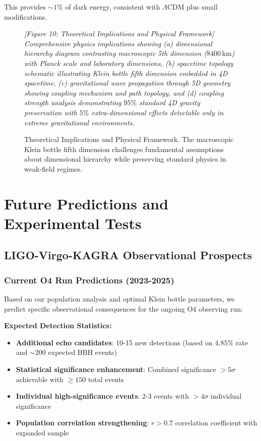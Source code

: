 \documentclass[reprint,amsmath,amssymb,aps,prd]{revtex4-2}
\newcommand{\km}{\,\text{km}}
\begin{document}
This provides $\sim 1\%$ of dark energy, consistent with $\Lambda$CDM plus small modifications.

\begin{figure}[htbp]
\centering
\textit{[Figure 10: Theoretical Implications and Physical Framework]}
\textit{Comprehensive physics implications showing (a) dimensional hierarchy diagram contrasting macroscopic 5th dimension ($8400\km$) with Planck scale and laboratory dimensions, (b) spacetime topology schematic illustrating Klein bottle fifth dimension embedded in 4D spacetime, (c) gravitational wave propagation through 5D geometry showing coupling mechanism and path topology, and (d) coupling strength analysis demonstrating $95\%$ standard 4D gravity preservation with $5\%$ extra-dimensional effects detectable only in extreme gravitational environments.}
\caption{Theoretical Implications and Physical Framework. The macroscopic Klein bottle fifth dimension challenges fundamental assumptions about dimensional hierarchy while preserving standard physics in weak-field regimes.}
\label{fig:theory_implications}
\end{figure}


\section{Future Predictions and Experimental Tests}
\label{sec:predictions}

\subsection{LIGO-Virgo-KAGRA Observational Prospects}

\subsubsection{Current O4 Run Predictions (2023-2025)}

Based on our population analysis and optimal Klein bottle parameters, we predict specific observational consequences for the ongoing O4 observing run:

\textbf{Expected Detection Statistics:}
\begin{itemize}
\item \textbf{Additional echo candidates}: 10-15 new detections (based on $4.85\%$ rate and $\sim 200$ expected BBH events)
\item \textbf{Statistical significance enhancement}: Combined significance $> 5\sigma$ achievable with $\geq 150$ total events
\item \textbf{Individual high-significance events}: 2-3 events with $> 4\sigma$ individual significance
\item \textbf{Population correlation strengthening}: $r > 0.7$ correlation coefficient with expanded sample
\end{itemize}
\end{document}
